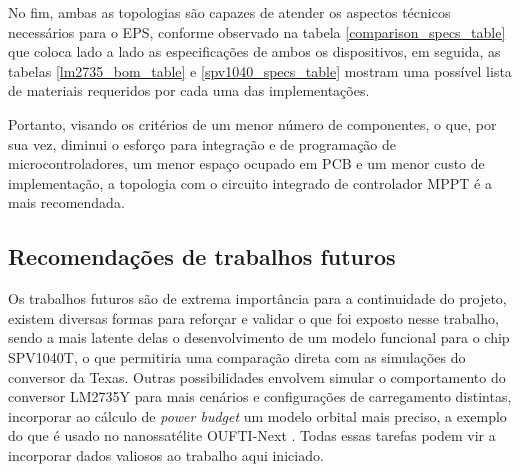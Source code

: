 No fim, ambas as topologias são capazes de atender os aspectos técnicos necessários para o EPS, conforme observado na tabela \ref{comparison_specs_table} que coloca lado a lado as especificações de ambos os dispositivos, em seguida, as tabelas \ref{lm2735_bom_table} e \ref{spv1040_specs_table} mostram uma possível lista de materiais requeridos por cada uma das implementações.

Portanto, visando os critérios de um menor número de componentes, o que, por sua vez, diminui o esforço para integração e de programação de microcontroladores, um menor espaço ocupado em PCB e um menor custo de implementação, a topologia com o circuito integrado de controlador MPPT é a mais recomendada.







\subsection*{Recomendações de trabalhos futuros}

Os trabalhos futuros são de extrema importância para a continuidade do projeto, existem diversas formas para reforçar e validar o que foi exposto nesse trabalho, sendo a mais latente delas o desenvolvimento de um modelo funcional para o chip SPV1040T, o que permitiria uma comparação direta com as simulações do conversor da Texas. Outras possibilidades envolvem simular o comportamento do conversor LM2735Y para mais cenários e configurações de carregamento distintas, incorporar ao cálculo de \textit{power budget} um modelo orbital mais preciso, a exemplo do que é usado no nanossatélite OUFTI-Next \cite{orbit_dynamics_ref}. Todas essas tarefas podem vir a incorporar dados valiosos ao trabalho aqui iniciado. 


